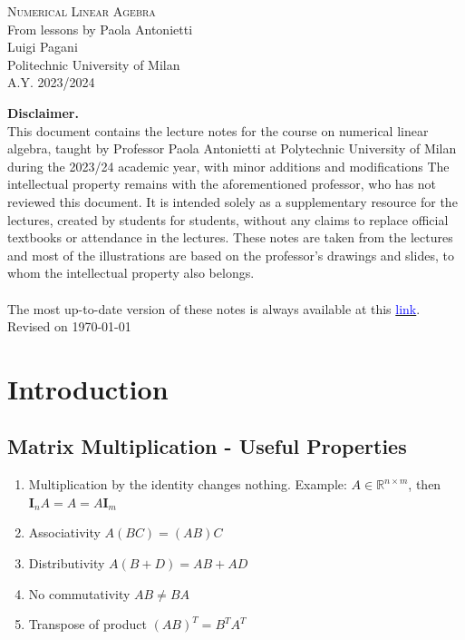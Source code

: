 \documentclass[11pt]{book}
\begin{document}
\begin{center}
	{\Huge \textsc{Numerical Linear Agebra}}\\
	\vspace*{1cm}
	{\large From lessons by Paola Antonietti}\\
	\vspace*{0.1cm}
	{\large {Luigi Pagani}}\\
	\vspace*{1cm}
	Politechnic University of Milan\\
	A.Y. 2023/2024
\end{center}




\vspace*{\fill}
\textbf{Disclaimer.} \\
This document contains the lecture notes for the course on numerical linear algebra, taught by Professor Paola Antonietti at Polytechnic University of Milan during the 2023/24 academic year, with minor additions and modifications
The intellectual property remains with the aforementioned professor, who has not reviewed this document. It is intended solely as a supplementary resource for the lectures, created by students for students, without any claims to replace official textbooks or attendance in the lectures. These notes are taken from the lectures and most of the illustrations are based on the professor's drawings and slides, to whom the intellectual property also belongs. \\ \\
The most up-to-date version of these notes is always available at this \href{https://www.overleaf.com/read/yqysrsbvccht#946a7e2}{\textcolor{blue}{link}}. \\
Revised on \today \\ 


\vspace*{\fill}

\newpage

\tableofcontents

\chapter{Introduction}
\section*{Matrix Multiplication - Useful Properties}
\begin{enumerate}
  \item Multiplication by the identity changes nothing. Example: $A \in \mathbb{R}^{n \times m}$, then $\mathbf{I}_{n} A=A=A \mathbf{I}_{m}$

  \item Associativity $A(B C)=(A B) C$

  \item Distributivity $A(B+D)=A B+A D$

  \item No commutativity $A B \neq B A$

  \item Transpose of product $(A B)^{T}=B^{T} A^{T}$

\end{enumerate}
\end{document}
